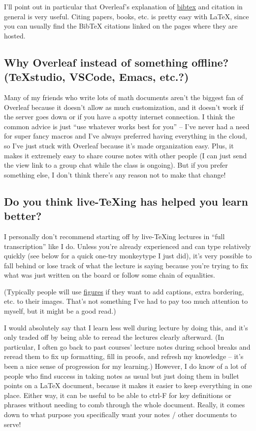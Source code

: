 \documentclass[11pt]{article}
\begin{document}
\begin{theorem}
I'll point out in particular that Overleaf's explanation of \href{https://www.overleaf.com/learn/latex/Bibliography_management_with_bibtex}{bibtex} and citation in general is very useful. Citing papers, books, etc. is pretty easy with LaTeX, since you can usually find the BibTeX citations linked on the pages where they are hosted.

\subsection*{Why Overleaf instead of something offline? (TeXstudio, VSCode, Emacs, etc.?)}
Many of my friends who write lots of math documents aren't the biggest fan of Overleaf because it doesn't allow as much customization, and it doesn't work if the server goes down or if you have a spotty internet connection. I think the common advice is just ``use whatever works best for you'' -- I've never had a need for super fancy macros and I've always preferred having everything in the cloud, so I've just stuck with Overleaf because it's made organization easy. Plus, it makes it extremely easy to share course notes with other people (I can just send the view link to a group chat while the class is ongoing). But if you prefer something else, I don't think there's any reason not to make that change! 

\subsection*{Do you think live-TeXing has helped you learn better?}
I personally don't recommend starting off by live-TeXing lectures in ``full transcription'' like I do. Unless you're already experienced and can type relatively quickly (see below for a quick one-try monkeytype I just did), it's very possible to fall behind or lose track of what the lecture is saying because you're trying to fix what was just written on the board or follow some chain of equalities. 


(Typically people will use \href{https://www.overleaf.com/learn/latex/Inserting_Images}{figures} if they want to add captions, extra bordering, etc. to their images. That's not something I've had to pay too much attention to myself, but it might be a good read.) 

I would absolutely say that I learn less well during lecture by doing this, and it's only traded off by being able to reread the lectures clearly afterward. (In particular, I often go back to past courses' lecture notes during school breaks and reread them to fix up formatting, fill in proofs, and refresh my knowledge -- it's been a nice sense of progression for my learning.) However, I do know of a lot of people who find success in taking notes as usual but just doing them in bullet points on a LaTeX document, because it makes it easier to keep everything in one place. Either way, it can be useful to be able to ctrl-F for key definitions or phrases without needing to comb through the whole document. Really, it comes down to what purpose you specifically want your notes / other documents to serve!


\end{theorem}
\end{document}
